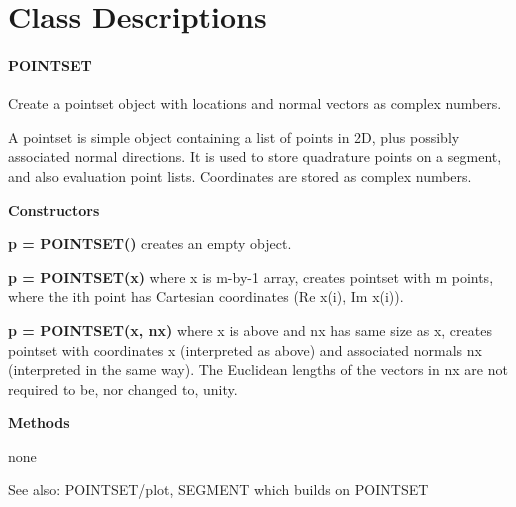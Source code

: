 \appendix

\setlength{\parskip}{\baselineskip}
\setlength{\parindent}{0pt}

\section{Class Descriptions}


\paragraph{POINTSET}

Create a pointset object with locations and normal vectors as
complex numbers.

A pointset is simple object containing a list of points in 2D, plus possibly
associated normal directions.  It is used to store quadrature points on a
segment, and also evaluation point lists. Coordinates are stored as 
complex numbers.

\textbf{Constructors}

\textbf{p = POINTSET()}
creates an empty object.
 
\textbf{p = POINTSET(x)} where x is m-by-1 array, creates pointset with m points, where
the ith point has Cartesian coordinates (Re x(i), Im x(i)).
  
\textbf{p = POINTSET(x, nx)} where x is above and nx has same size as x, creates
pointset with coordinates x (interpreted as above) and associated normals
nx (interpreted in the same way). The Euclidean lengths of the vectors in
nx are not required to be, nor changed to, unity.

\textbf{Methods}

none

See also: POINTSET/plot, SEGMENT which builds on POINTSET


